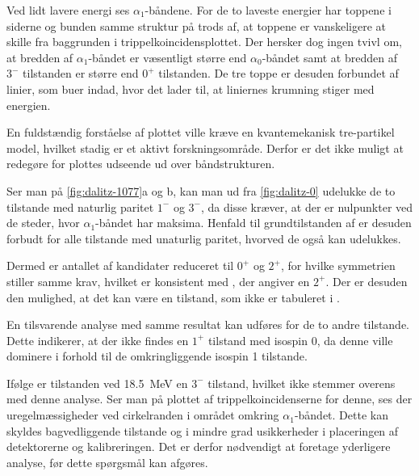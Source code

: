 Ved lidt lavere energi ses $\alpha_{1}$-båndene. For de to laveste energier har toppene i siderne og 
bunden samme struktur på trods af, at toppene er vanskeligere at skille fra baggrunden i
trippelkoincidensplottet. Der hersker dog ingen tvivl om, at bredden af $\alpha_{1}$-båndet er væsentligt
større end $\alpha_{0}$-båndet samt at bredden af $3^{-}$ tilstanden er større end $0^{+}$
tilstanden. De tre toppe er desuden forbundet af linier, som buer indad, hvor det lader til, at
liniernes krumning stiger med energien.

En fuldstændig forståelse af plottet ville kræve en kvantemekanisk tre-partikel model, hvilket
stadig er et aktivt forskningsområde. Derfor er det ikke muligt at redegøre for plottes udseende ud over
båndstrukturen.


Ser man på \cref{fig:dalitz-1077}a og b, kan man ud fra \cref{fig:dalitz-0} udelukke de to tilstande
med naturlig paritet $1^{-}$ og $3^{-}$, da disse kræver, at der er nulpunkter ved de steder, hvor
$\alpha_{1}$-båndet har maksima. Henfald til grundtilstanden af \Be er desuden forbudt for alle
tilstande med unaturlig paritet, hvorved de også kan udelukkes.

Dermed er antallet af kandidater reduceret til $0^{+}$ og $2^{+}$, for hvilke symmetrien stiller
samme krav, hvilket er konsistent med \cite{States}, der angiver en $2^{+}$. Der er desuden den
mulighed, at det kan være en tilstand, som ikke er tabuleret i \cite{Fedorov}.

En tilsvarende analyse med samme resultat kan udføres for de to andre tilstande. Dette indikerer, at
der ikke findes en $1^{+}$ tilstand med isospin 0, da denne ville dominere i forhold til de
omkringliggende isospin 1 tilstande. 

Ifølge \cite{States} er tilstanden ved \SI{18.5}{\MeV} en $3^{-}$ tilstand, hvilket ikke stemmer
overens med denne analyse. Ser man på plottet af trippelkoincidenserne for denne, ses der
uregelmæssigheder ved cirkelranden i området omkring $\alpha_{1}$-båndet. Dette kan skyldes
bagvedliggende tilstande og i mindre grad usikkerheder i placeringen af detektorerne og
kalibreringen. Det er derfor nødvendigt at foretage yderligere analyse, før dette spørgsmål kan
afgøres.















